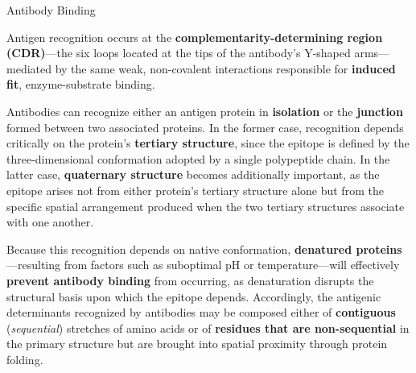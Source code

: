     \begin{core}{Antibody Binding}

      Antigen recognition occurs at the \textbf{complementarity-determining region (CDR)}---the six loops located at the tips of the antibody's Y-shaped arms---mediated by the same weak, non-covalent interactions responsible for \textbf{induced fit}, enzyme-substrate binding.


      Antibodies can recognize either an antigen protein in \textbf{isolation} or the \textbf{junction} formed between two associated proteins. In the former case, recognition depends critically on the protein's \textbf{tertiary structure}, since the epitope is defined by the three-dimensional conformation adopted by a single polypeptide chain. In the latter case, \textbf{quaternary structure} becomes additionally important, as the epitope arises not from either protein's tertiary structure alone but from the specific spatial arrangement produced when the two tertiary structures associate with one another.

      Because this recognition depends on native conformation, \textbf{denatured proteins}---resulting from factors such as suboptimal pH or temperature---will effectively \textbf{prevent antibody binding} from occurring, as denaturation disrupts the structural basis upon which the epitope depends. Accordingly, the antigenic determinants recognized by antibodies may be composed either of \textbf{contiguous} (\textit{sequential}) stretches of amino acids or of \textbf{residues that are non-sequential} in the primary structure but are brought into spatial proximity through protein folding.

    \end{core}

